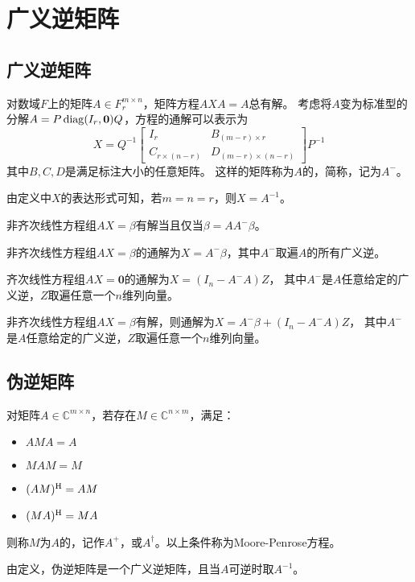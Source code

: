 \section{广义逆矩阵}
\subsection{广义逆矩阵}

\begin{definition}[广义逆矩阵]
    对数域$F$上的矩阵$A\in F^{m\times n}_r$，矩阵方程$AXA=A$总有解。
    考虑将$A$变为标准型的分解$A=P\operatorname{diag}(I_r, \bm{0})Q$，方程的通解可以表示为
    \[
        X=Q^{-1}
        \begin{bmatrix}
            I_r & B_{(m-r) \times r} \\
            C_{r\times (n-r)} & D_{(m-r)\times (n-r)}
        \end{bmatrix}
        P^{-1}
    \]
    其中$B,C,D$是满足标注大小的任意矩阵。
    这样的矩阵称为$A$的，简称，记为$A^{-}$。
\end{definition}

由定义中$X$的表达形式可知，若$m=n=r$，则$X=A^{-1}$。

\begin{theorem}[非齐次方程组相容性定理]
    非齐次线性方程组$AX=\beta$有解当且仅当$\beta=AA^{-}\beta$。
\end{theorem}

\begin{theorem}[非齐次线性方程组解的结构定理]
    非齐次线性方程组$AX=\beta$的通解为$X=A^{-} \beta$，其中$A^{-}$取遍$A$的所有广义逆。
\end{theorem}

\begin{theorem}[齐次线性方程组解的结构定理]
    齐次线性方程组$AX=\bm{0}$的通解为$X=(I_n-A^{-}A)Z$，
    其中$A^{-}$是$A$任意给定的广义逆，$Z$取遍任意一个$n$维列向量。
\end{theorem}

\begin{corollary}
    非齐次线性方程组$AX=\beta$有解，则通解为$X=A^{-} \beta+(I_n-A^{-} A)Z$，
    其中$A^{-}$是$A$任意给定的广义逆，$Z$取遍任意一个$n$维列向量。
\end{corollary}

\subsection{伪逆矩阵}

\begin{definition}[伪逆矩阵]
    对矩阵$A\in \mathbb{C}^{m\times n}$，若存在$M\in \mathbb{C}^{n\times m}$，满足：
    \begin{itemize}
        \item $AMA=A$
        \item $MAM=M$
        \item $(AM)^\mathrm{H} = AM$
        \item $(MA)^\mathrm{H} = MA$
    \end{itemize}
    则称$M$为$A$的，记作$A^{+}$，或$A^{\dagger}$。以上条件称为{Moore-Penrose方程}。
\end{definition}
由定义，伪逆矩阵是一个广义逆矩阵，且当$A$可逆时取$A^{-1}$。

